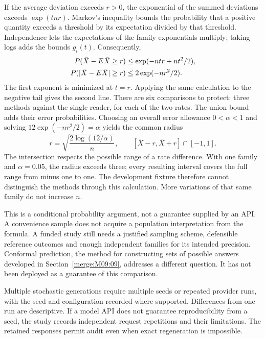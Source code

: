 If the average deviation exceeds $r>0$, the exponential of the summed deviations
exceeds $\exp(tnr)$. Markov's inequality bounds the probability that a positive
quantity exceeds a threshold by its expectation divided by that threshold.
Independence lets the expectations of the family exponentials multiply; taking
logs adds the bounds $g_i(t)$. Consequently,
\begin{align}
 P(\bar X-E\bar X\geq r)
 &\leq \exp(-ntr+nt^2/2),\notag\\
 P(|\bar X-E\bar X|\geq r)
 &\leq 2\exp(-nr^2/2).
 \label{eq:family-tail}
\end{align}
The first exponent is minimized at $t=r$. Applying the same calculation to the
negative tail gives the second line. There are six comparisons to protect:
three methods against the single reader, for each of the two rates. The union
bound adds their error probabilities. Choosing an overall error allowance
$0<\alpha<1$ and solving $12\exp(-nr^2/2)=\alpha$ yields the common radius
\begin{equation}
 r=\sqrt{\frac{2\log(12/\alpha)}{n}},\qquad
 [\bar X-r,\bar X+r]\cap[-1,1].
 \label{eq:family-interval}
\end{equation}
The intersection respects the possible range of a rate difference. With one
family and $\alpha=0.05$, the radius exceeds three; every resulting interval
covers the full range from minus one to one. The development fixture therefore
cannot distinguish the methods through this calculation. More variations of
that same family do not increase $n$.

This is a conditional probability argument, not a guarantee supplied by an
API. A convenience sample does not acquire a population interpretation from
the formula. A funded study still needs a justified sampling scheme, defensible
reference outcomes and enough independent families for its intended precision.
Conformal prediction, the method for constructing sets of possible answers
developed in Section~\ref{merge:M09:09}, addresses a different question. It has
not been deployed as a guarantee of this comparison.


Multiple stochastic generations require multiple seeds or repeated provider runs,
with the seed and configuration recorded where supported. Differences from one
run are descriptive. If a model API does not guarantee reproducibility from a
seed, the study records independent request repetitions and their limitations.
The retained responses permit audit even when exact regeneration is impossible.

